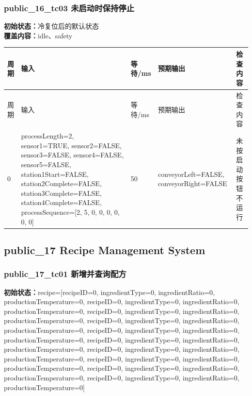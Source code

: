 \subsubsection{{\ttfamily public\_16\_tc03} 未启动时保持停止}

\noindent\textbf{初始状态：}冷复位后的默认状态\\

\textbf{覆盖内容：}idle、safety

\begin{longtable}{L{1.0cm}L{4.7cm}L{1.4cm}L{4.0cm}L{2.1cm}}

\toprule

周期 & 输入 & 等待/ms & 预期输出 & 检查内容\\

\midrule

\endfirsthead

\toprule

周期 & 输入 & 等待/ms & 预期输出 & 检查内容\\

\midrule

\endhead

0 & processLength=2, sensor1=TRUE, sensor2=FALSE, sensor3=FALSE, sensor4=FALSE, sensor5=FALSE, station1Start=FALSE, station2Complete=FALSE, station3Complete=FALSE, station4Complete=FALSE, processSequence=[2, 5, 0, 0, 0, 0, 0, 0] & 50 & conveyorLeft=FALSE, conveyorRight=FALSE & 未按启动按钮不运行\\

\bottomrule

\end{longtable}

\subsection{{\ttfamily public\_17} Recipe Management System}

\subsubsection{{\ttfamily public\_17\_tc01} 新增并查询配方}

\noindent\textbf{初始状态：}recipe=[recipeID=0, ingredientType=0, ingredientRatio=0, productionTemperature=0, recipeID=0, ingredientType=0, ingredientRatio=0, productionTemperature=0, recipeID=0, ingredientType=0, ingredientRatio=0, productionTemperature=0, recipeID=0, ingredientType=0, ingredientRatio=0, productionTemperature=0, recipeID=0, ingredientType=0, ingredientRatio=0, productionTemperature=0, recipeID=0, ingredientType=0, ingredientRatio=0, productionTemperature=0, recipeID=0, ingredientType=0, ingredientRatio=0, productionTemperature=0, recipeID=0, ingredientType=0, ingredientRatio=0, productionTemperature=0, recipeID=0, ingredientType=0, ingredientRatio=0, productionTemperature=0, recipeID=0, ingredientType=0, ingredientRatio=0, productionTemperature=0]\\

